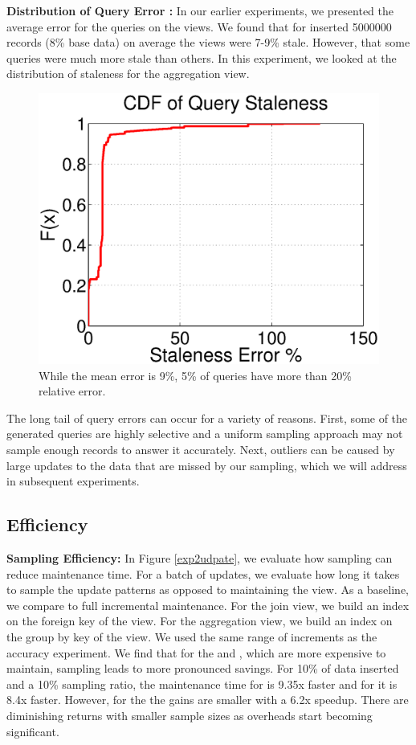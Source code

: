 {\noindent \bf Distribution of Query Error :} In our earlier experiments, we presented the average error for the queries on the views.
We found that for inserted 5000000 records (8\% base data) on average the views were 7-9\% stale. 
However, that some queries were much more stale than others.
In this experiment, we looked at the distribution of staleness for the aggregation view.

\begin{figure}[ht!]
\label{exp3dist}
\centering
 \includegraphics[scale=0.25]{exp/query_error_dist.eps}
 \caption{While the mean error is 9\%, 5\% of queries have more than 20\% relative error.}
\end{figure}

The long tail of query errors can occur for a variety of reasons.
First, some of the generated queries are highly selective and a uniform sampling approach may not sample enough records to answer it accurately.
Next, outliers can be caused by large updates to the data that are missed by our sampling, which we will address in subsequent experiments.

\subsection{Efficiency}

{\noindent \bf Sampling Efficiency: }
In Figure \ref{exp2udpate}, we evaluate how sampling can reduce maintenance time.
For a batch of updates, we evaluate how long it takes to sample the update patterns as opposed to maintaining the view.
As a baseline, we compare to full incremental maintenance.
For the join view, we build an index on the foreign key of the view.
For the aggregation view, we build an index on the group by key of the view.
We used the same range of increments as the accuracy experiment.
We find that for the \aggview and \fjview, which are more expensive to maintain, sampling leads to more pronounced savings. 
For 10\% of data inserted and a 10\% sampling ratio, the maintenance time for \fjview  is 9.35x faster and for \aggview it is 8.4x faster.
However, for the \spview the gains are smaller with a 6.2x speedup.
There are diminishing returns with smaller sample sizes as overheads start becoming significant. 

